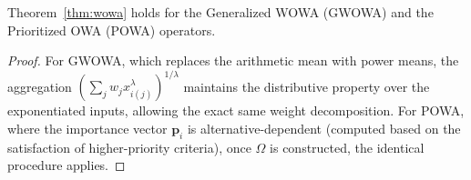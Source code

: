 \begin{corollary}
	\label{cor:gwowa_powa}
	Theorem~\ref{thm:wowa} holds for the Generalized WOWA (GWOWA) \cite{GWOWA} and the Prioritized OWA (POWA) \cite{POWA} operators. 
\end{corollary}

\begin{proof}
		For GWOWA, which replaces the arithmetic mean with power means, the aggregation $\left( \sum_j w_j x_{i(j)}^\lambda \right)^{1/\lambda}$ maintains the distributive property over the exponentiated inputs, allowing the exact same weight decomposition. For POWA, where the importance vector $\mathbf{p}_i$ is alternative-dependent (computed based on the satisfaction of higher-priority criteria), once $\Omega$ is constructed, the identical procedure applies.
	\end{proof}
